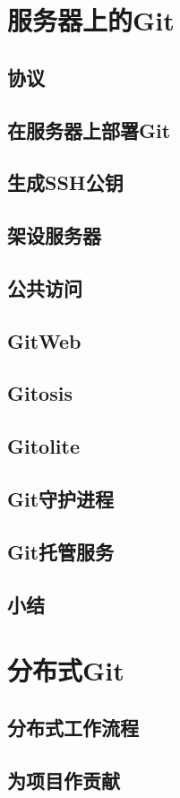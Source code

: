 \documentclass{book}
\begin{document}
\chapter{服务器上的Git}
	\section{协议}
	\section{在服务器上部署Git}
	\section{生成SSH公钥}
	\section{架设服务器}
	\section{公共访问}
	\section{GitWeb}
	\section{Gitosis}
	\section{Gitolite}
	\section{Git守护进程}
	\section{Git托管服务}
	\section{小结}

\chapter{分布式Git}
	\section{分布式工作流程}
	\section{为项目作贡献}
\end{document}
